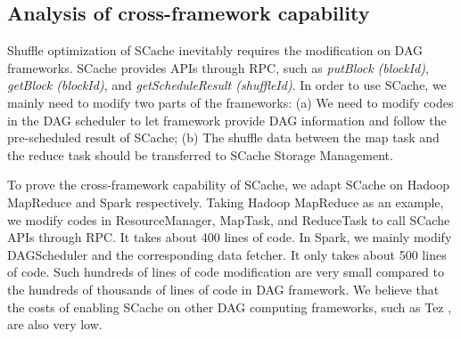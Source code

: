{\color{blue}
\subsection{Analysis of cross-framework capability}\label{crossframework}
Shuffle optimization of SCache inevitably requires the modification on DAG frameworks. SCache provides APIs through RPC, such as \textit{putBlock (blockId)}, \textit{getBlock (blockId)}, and \textit{getScheduleResult (shuffleId)}. In order to use SCache, we mainly need to modify two parts of the frameworks: (a) We need to modify codes in the DAG scheduler to let framework provide DAG information and follow the pre-scheduled result of SCache; (b) The shuffle data between the map task and the reduce task should be transferred to SCache Storage Management.

To prove the cross-framework capability of SCache, we adapt SCache on Hadoop MapReduce and Spark respectively. Taking Hadoop MapReduce as an example, we modify codes in ResourceManager, MapTask, and ReduceTask to call SCache APIs through RPC. It takes about 400 lines of code. In Spark, we mainly modify DAGScheduler and the corresponding data fetcher. 
It only takes about 500 lines of code. Such hundreds of lines of code modification are very small compared to the hundreds of thousands of lines of code in DAG framework. We believe that the costs of enabling SCache on other DAG computing frameworks, such as Tez \cite{tez}, are also very low.
}

